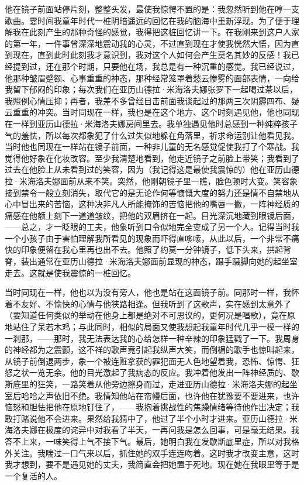 \documentclass[12pt, UTF8]{ctexbook}
\begin{document}
\par 他在镜子前面站停片刻，整整头发，最使我惊愕不置的是：我忽然听到他在哼一支歌曲。霎时间我童年时代一桩阴暗遥远的回忆在我的脑海中重新浮现。为了便于理解我在此刻产生的那种奇怪的感觉，我得把这桩回忆讲一下。在我刚来到这户人家的第一年，一件事曾深深地震动我的心灵，不过直到现在才使我恍然大悟，因为直到现在，直到此时此刻我才意识到，我对这个人如何会产生莫名其妙的反感！我已经提到过，还在那个时期，只要他在场，我总是有一种沉重的感觉。我已经说过，他那种皱眉蹙额、心事重重的神态，那种经常笼罩着愁云惨雾的面部表情，一向给我留下郁闷的印象；每次我们在亚历山德拉·米海洛夫娜张罗下一起喝过茶以后，我照例心情压抑；再者，我差不多曾经目击前面我谈起过的那两三次阴霾四布、疑云重重的冲突。当时同现在一样，我也是在这个地方、这个时刻遇见他，他也同现在一样到亚历山德拉·米海洛夫娜房间里去。我单独遇见他时总感到一种纯粹孩子气的羞怯，所以每次都象犯了什么过失似地躲在角落里，祈求命运别让他看见我。当时他也同现在一样站在镜子前面，一种非儿童的无名感觉促使我打了个寒战。我觉得他好象在化妆改容。至少我清楚地看到，他走近镜子之前脸上带笑；我看到了过去在他脸上从未看到过的笑容，因为（我记得这是最使我震惊的）他在亚历山德拉·米海洛夫娜面前从来不笑。突然，他刚朝镜子里一瞧，脸色顿时大变。笑容象接到禁令一般立刻消失，取代它的是无论作何等慷慨大度的努力还是情不自禁地从心中冒出来的苦恼，这种决非凡人所能掩饰的苦恼把他的嘴唇一撇，一阵神经质的痛感在他额上刻下一道道皱纹，把他的双眉挤在一起。目光深沉地藏到眼镜后面，——总之，才一眨眼的工夫，他象听到口令似地完全变成了另一个人。记得当时我一个小孩子由于害怕理解我所看见的现象而吓得直哆嗦，从此以后，一个非常不痛快的印象便留在我心里再也出不去。他照了约莫一分钟镜子，低下头来，拱起背脊，装出通常在亚历山德拉·米海洛夫娜面前显现的神态，蹑手蹑脚向她的起坐室走去。这就是使我震惊的一桩回忆。
\par 当时同现在一样，他也以为没有旁人，他也是站在这面镜子前。同那时一样，我怀着不友好、不愉快的心情与他狭路相逢。但我听到了这歌声，实在感到太意外了（要知道任何类似的举动在他身上都是绝对不可思议的，更何况是唱歌），竟在原地站住了呆若木鸡；与此同时，相似的局面又使我想起我童年时代几乎一模一样的一刹那，——那时，我无法表达我的心给怎样一种辛辣的印象猛戳了一下。我周身的神经都为之震颤，这不祥的歌声竟引起我纵声大笑，而倒楣的歌手也惊叫起来，从镜子前倒退两步，象一个被连赃拿获的罪犯面无人色地望着我，恐怖、惊愕、狂怒之状一览无余。他的目光激起了我病态的反应。我冲着他发出一阵神经质的、歇斯底里的狂笑，一路笑着从他旁边擦身而过，走进亚历山德拉·米海洛夫娜的起坐室后哈哈之声依旧不绝。我情知他站在帘幔后面，也许他在犹豫要不要进来，也许恼怒和胆怯把他在原地钉住了，——我抱着挑战性的焦躁情绪等待他作出决定；我敢打赌说他不会进来。果然给我猜中了，他过了半个小时才进来。亚历山德拉·米海洛夫娜在极度的诧异中对我看了半天，一再问我是怎么回事，可是毫无结果。我答不上来，一味笑得上气不接下气。最后，她明白我在发歇斯底里症，所以对我格外关注。我喘过一口气来以后，抓住她的双手连连吻着。这时我才改变主意，这时我才想到，要不是遇见她的丈夫，我简直会把她置于死地。现在她在我眼里等于是一个复活的人。
\end{document}
